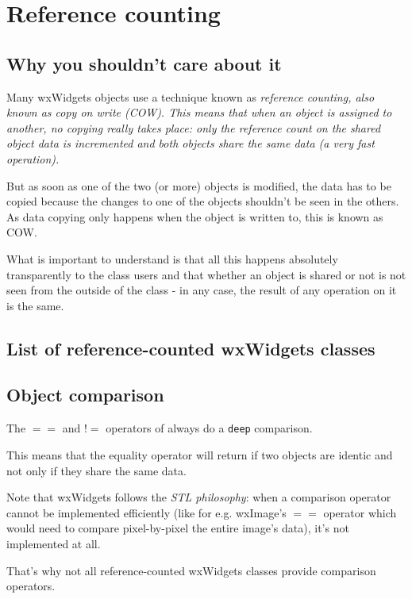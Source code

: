 \section{Reference counting}\label{trefcount}

\subsection{Why you shouldn't care about it}\label{refcount}

Many wxWidgets objects use a technique known as \it{reference counting}, also known
as {\it copy on write} (COW).
This means that when an object is assigned to another, no copying really takes place:
only the reference count on the shared object data is incremented and both objects
share the same data (a very fast operation).

But as soon as one of the two (or more) objects is modified, the data has to be
copied because the changes to one of the objects shouldn't be seen in the
others. As data copying only happens when the object is written to, this is
known as COW.

What is important to understand is that all this happens absolutely
transparently to the class users and that whether an object is shared or not
is not seen from the outside of the class - in any case, the result of any
operation on it is the same.

\subsection{List of reference-counted wxWidgets classes}\label{refcountlist}
\subsection{Object comparison}\label{refcountequality}

The $==$ and $!=$ operators of 
always do a {\tt deep} comparison.

This means that the equality operator will return \true if two objects are
identic and not only if they share the same data.

Note that wxWidgets follows the {\it STL philosophy}: when a comparison operator cannot
be implemented efficiently (like for e.g. wxImage's $==$ operator which would need to
compare pixel-by-pixel the entire image's data), it's not implemented at all.

That's why not all reference-counted wxWidgets classes provide comparison operators.

